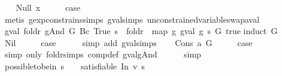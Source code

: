 \begin{isabellebody}
\isamarkupfalse%
\isanewline
\ \ \isamarkupfalse%
\ {\isacharparenleft}Null\ x{\isacharparenright}\isanewline
\ \ \isamarkupfalse%
\ \isamarkupfalse%
\ {\isacharquery}case\isanewline
\ \ \ \ \isamarkupfalse%
\ {\isacharparenleft}metis\ gexp{\isacharunderscore}constrains{\isachardot}simps{\isacharparenleft}{}{\isacharparenright}\ gval{\isachardot}simps{\isacharparenleft}{}{\isacharparenright}\ unconstrained{\isacharunderscore}variable{\isacharunderscore}swap{\isacharunderscore}aval{\isacharparenright}\isanewline
{}\isamarkupfalse%
%
\endisatagproof
{\isafoldproof}%
%
\isadelimproof
\isanewline
%
\endisadelimproof
\isanewline
{}\isamarkupfalse%
\ {\isachardoublequoteopen}gval\ {\isacharparenleft}foldr\ gAnd\ G\ {\isacharparenleft}Bc\ True{\isacharparenright}{\isacharparenright}\ s\ {\isacharequal}\ foldr\ {\isacharparenleft}{\isasymand}\isactrlsub {\isacharquery}{\isacharparenright}\ {\isacharparenleft}map\ {\isacharparenleft}{\isasymlambda}g{\isachardot}\ gval\ g\ s{\isacharparenright}\ G{\isacharparenright}\ true{\isachardoublequoteclose}\isanewline
%
\isadelimproof
%
\endisadelimproof
%
\isatagproof
{}\isamarkupfalse%
{\isacharparenleft}induct\ G{\isacharparenright}\isanewline
\ \ \isamarkupfalse%
\ Nil\isanewline
\ \ \isamarkupfalse%
\ \isamarkupfalse%
\ {\isacharquery}case\isanewline
\ \ \ \ \isamarkupfalse%
\ {\isacharparenleft}simp\ add{\isacharcolon}\ gval{\isachardot}simps{\isacharparenright}\isanewline
{}\isamarkupfalse%
\isanewline
\ \ \isamarkupfalse%
\ {\isacharparenleft}Cons\ a\ G{\isacharparenright}\isanewline
\ \ \isamarkupfalse%
\ \isamarkupfalse%
\ {\isacharquery}case\isanewline
\ \ \ \ \isamarkupfalse%
\ {\isacharparenleft}simp\ only{\isacharcolon}\ foldr{\isachardot}simps\ comp{\isacharunderscore}def\ gval{\isacharunderscore}gAnd{\isacharparenright}\isanewline
\ \ \ \ \isamarkupfalse%
\ simp\isanewline
{}\isamarkupfalse%
%
\endisatagproof
{\isafoldproof}%
%
\isadelimproof
\isanewline
%
\endisadelimproof
\isanewline
{}\isamarkupfalse%
\ possible{\isacharunderscore}to{\isacharunderscore}be{\isacharunderscore}in{\isacharcolon}\ {\isachardoublequoteopen}s\ {\isasymnoteq}\ {\isacharbrackleft}{\isacharbrackright}\ {\isasymLongrightarrow}\ satisfiable\ {\isacharparenleft}In\ v\ s{\isacharparenright}{\isachardoublequoteclose}\isanewline

\end{isabellebody}
